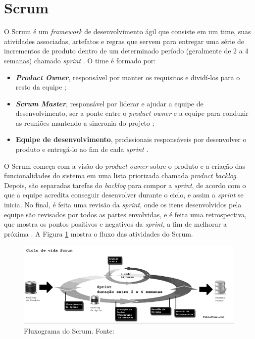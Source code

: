\section{Scrum}

O Scrum é um \textit{framework} de desenvolvimento ágil que consiste em um time, suas atividades associadas, artefatos e regras que servem para entregar uma série de incrementos de produto dentro de um determinado período (geralmente de 2 a 4 semanas) chamado \textit{sprint} \cite{livro-scrum}.
O time é formado por:
\begin{itemize}
\item \textbf{\textit{Product Owner}}, responsável por manter os requisitos e dividí-los para o resto da equipe \cite{product-owner};
\item \textbf{\textit{Scrum Master}}, responsável por liderar e ajudar a equipe de desenvolvimento, ser a ponte entre o \textit{product owner} e a equipe para conduzir as reuniões mantendo a sincronia do projeto \cite{scrum-master};
\item \textbf{Equipe de desenvolvimento}, profissionais responsáveis por desenvolver o produto e entregá-lo ao fim de cada \textit{sprint} \cite{equipe-dev}.
\end{itemize}

O Scrum começa com a visão do \textit{product owner} sobre o produto e a criação das funcionalidades do sistema em uma lista priorizada chamada \textit{product backlog}. Depois, são separadas tarefas do \textit{backlog} para compor a \textit{sprint}, de acordo com o que a equipe acredita conseguir desenvolver durante o ciclo, e assim a \textit{sprint} se inicia. No final, é feita uma revisão da \textit{sprint}, onde os itens desenvolvidos pela equipe são revisados por todos as partes envolvidas, e é feita uma retrospectiva, que mostra os pontos positivos e negativos da \textit{sprint}, a fim de melhorar a próxima \cite{livro-scrum}. A Figura \ref{img:scrum} mostra o fluxo das atividades do Scrum.

\begin{figure}[H]
    \centering
    \includegraphics[scale=0.5]{figuras/scrum.png}
    \caption[Fluxograma do Scrum]{Fluxograma do Scrum. Fonte: \cite{artigo-scrum}}
    \label{img:scrum}
\end{figure}
